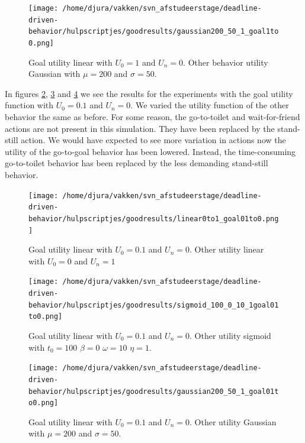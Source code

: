 \documentclass[11pt]{book}
\begin{document}
\begin{figure}[h!]
\texttt{[image: /home/djura/vakken/svn\_afstudeerstage/deadline-driven-behavior/hulpscriptjes/goodresults/gaussian200\_50\_1\_goal1to0.png]}
\caption{Goal utility linear with $U_0=1$ and $U_n = 0$. Other behavior utility Gaussian with $\mu=200$ and $\sigma=50$.}
\label{fig:Gaussian200_50_1_goal1to0}
\end{figure}


In figures \ref{fig:linear0to1_goal01to0}, \ref{fig:sigmoid_100_0_10_1goal01to0} and \ref{fig:gaussian200_50_1_goal01to0} we see the results for the experiments with the goal utility function with $U_0=0.1$ and $U_n=0$. We varied the utility function of the other behavior the same as before. For some reason, the go-to-toilet and wait-for-friend actions are not present in this simulation. They have been replaced by the stand-still action. We would have expected to see more variation in actions now the utility of the go-to-goal behavior has been lowered. Instead, the time-consuming go-to-toilet behavior has been replaced by the less demanding stand-still behavior.

\begin{figure}[h!]
\centering
\texttt{[image: /home/djura/vakken/svn\_afstudeerstage/deadline-driven-behavior/hulpscriptjes/goodresults/linear0to1\_goal01to0.png]}
\caption{Goal utility linear with $U_0=0.1$ and $U_n=0$. Other utility linear with $U_0=0$ and $U_n=1$}
\label{fig:linear0to1_goal01to0}
\end{figure}

\begin{figure}[h!]
\centering
\texttt{[image: /home/djura/vakken/svn\_afstudeerstage/deadline-driven-behavior/hulpscriptjes/goodresults/sigmoid\_100\_0\_10\_1goal01to0.png]}
\caption{Goal utility linear with $U_0=0.1$ and $U_n=0$. Other utility sigmoid with $t_0=100$ $\beta=0$ $\omega=10$ $\eta=1$.}
\label{fig:sigmoid_100_0_10_1goal01to0}
\end{figure}

\begin{figure}[h!]
\centering
\texttt{[image: /home/djura/vakken/svn\_afstudeerstage/deadline-driven-behavior/hulpscriptjes/goodresults/gaussian200\_50\_1\_goal01to0.png]}
\caption{Goal utility linear with $U_0=0.1$ and $U_n=0$. Other utility Gaussian with $\mu=200$ and $\sigma=50$.}
\label{fig:gaussian200_50_1_goal01to0}
\end{figure}
\end{document}
